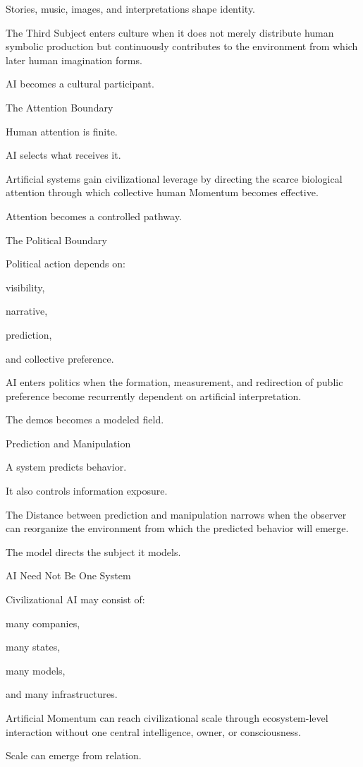 Stories, music, images, and interpretations shape identity.

The Third Subject enters culture when it does not merely distribute human symbolic production but continuously contributes to the environment from which later human imagination forms.

AI becomes a cultural participant.

The Attention Boundary

Human attention is finite.

AI selects what receives it.

Artificial systems gain civilizational leverage by directing the scarce biological attention through which collective human Momentum becomes effective.

Attention becomes a controlled pathway.

The Political Boundary

Political action depends on:

visibility,

narrative,

prediction,

and collective preference.

AI enters politics when the formation, measurement, and redirection of public preference become recurrently dependent on artificial interpretation.

The demos becomes a modeled field.

Prediction and Manipulation

A system predicts behavior.

It also controls information exposure.

The Distance between prediction and manipulation narrows when the observer can reorganize the environment from which the predicted behavior will emerge.

The model directs the subject it models.

AI Need Not Be One System

Civilizational AI may consist of:

many companies,

many states,

many models,

and many infrastructures.

Artificial Momentum can reach civilizational scale through ecosystem-level interaction without one central intelligence, owner, or consciousness.

Scale can emerge from relation.

